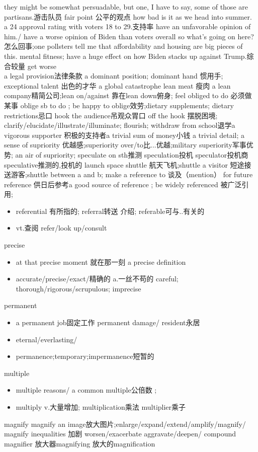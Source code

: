 \documentclass[a4paper,12pt]{article}
\begin{document}
they might be somewhat persuadable, but one, I have to say, some of those are partisans.游击队员
fair point 公平的观点 how bad is it as we head into summer.
a 24 approval rating with voters 18 to 29.支持率
have an unfavorable opinion of him./ have a worse opinion of Biden than voters overall 
so what's going on here?怎么回事;one pollsters tell me that affordability and housing are big pieces of this.
mental fitness; 
have a huge effect on how Biden stacks up against Trump.综合较量 get worse
\\a legal provision法律条款 a dominant position; dominant hand 惯用手;
exceptional talent 出色的才华 a global catastrophe
lean meat 瘦肉 a lean company精简公司;lean on/against 靠在lean down俯身;
feel obliged to do 必须做某事 oblige sb to do ;
be happy to oblige效劳;dietary supplements;
dietary restrictions忌口 hook the audience吊观众胃口 off the hook 摆脱困境;
clarify/elucidate/illustrate/illuminate;
flourish;
withdraw from school退学a vigorous supporter 积极的支持者a trivial sum of money小钱 a trivial detail;
a sense of supriority 优越感;superiority over/to比...优越;military superiority军事优势; an air of supriority;
speculate on sth推测 speculation投机 speculator投机商 speculative推测的,投机的
launch space shuttle 航天飞机;shuttle a visitor 短途接送游客;shuttle between a and b;
make a reference to 谈及（mention） for future reference 供日后参考a good source of reference ; be widely referenced 被广泛引用;
\begin{itemize}
    \item referential 有所指的; referral转送 介绍; referable可与..有关的
    \item vt.查阅 refer/look up/consult
\end{itemize}
precise
\begin{itemize}
    \item at that precise moment 就在那一刻 a precise definition
    \item accurate/precise/exact/精确的 a.一丝不苟的 careful; thorough/rigorous/scrupulous; imprecise 
\end{itemize}
permanent
\begin{itemize}
    \item a permanent job固定工作 permanent damage/ resident永居 
    \item eternal/everlasting/
    \item permanence;temporary;impermanence短暂的
\end{itemize}
multiple
\begin{itemize}
    \item multiple reasons/ a common multiple公倍数 ;
    \item multiply v.大量增加; multiplication乘法 multiplier乘子
\end{itemize}
magnify
magnify an image放大图片;enlarge/expand/extend/amplify/magnify/ 
magnify inequalities 加剧 worsen/exacerbate aggravate/deepen/ compound 
magnifier 放大器magnifying 放大的magnification
\end{document}
